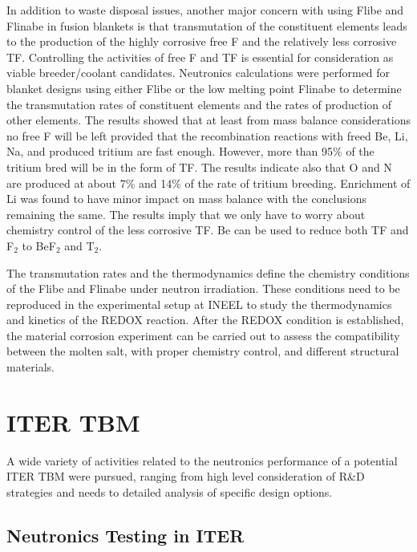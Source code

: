 In addition to waste disposal issues, another major concern with using Flibe
and Flinabe in fusion blankets is that transmutation of the constituent
elements leads to the production of the highly corrosive free F and the
relatively less corrosive TF. Controlling the activities of free F and TF is
essential for consideration as viable breeder/coolant candidates. Neutronics
calculations were performed for blanket designs using either Flibe or the low
melting point Flinabe to determine the transmutation rates of constituent
elements and the rates of production of other elements. The results showed
that at least from mass balance considerations no free F will be left provided
that the recombination reactions with freed Be, Li, Na, and produced tritium
are fast enough. However, more than 95\% of the tritium bred will be in the
form of TF. The results indicate also that O and N are produced at about 7\%
and 14\% of the rate of tritium breeding.  Enrichment of Li was found to have
minor impact on mass balance with the conclusions remaining the same. The
results imply that we only have to worry about chemistry control of the less
corrosive TF. Be can be used to reduce both TF and F$_2$ to BeF$_2$ and T$_2$.

The transmutation rates and the thermodynamics define the chemistry conditions
of the Flibe and Flinabe under neutron irradiation. These conditions need to
be reproduced in the experimental setup at INEEL to study the thermodynamics
and kinetics of the REDOX reaction.  After the REDOX condition is established,
the material corrosion experiment can be carried out to assess the
compatibility between the molten salt, with proper chemistry control, and
different structural materials.

\section{ITER \gls{TBM}}

A wide variety of activities related to the neutronics performance of a
potential ITER \gls{TBM} were pursued, ranging from high level consideration
of R\&D strategies and needs to detailed analysis of specific design options.

\subsection{Neutronics Testing in ITER}

